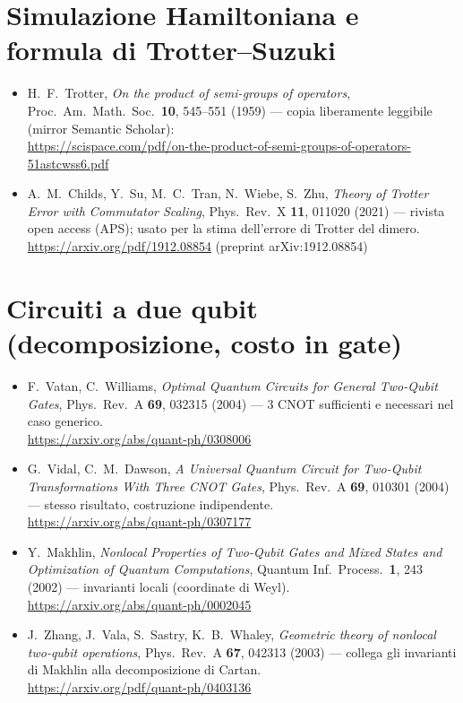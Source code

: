 \documentclass[11pt,a4paper]{article}
\begin{document}
\section{Simulazione Hamiltoniana e formula di Trotter--Suzuki}

\begin{itemize}[leftmargin=1.3em]
\item H.\ F.\ Trotter, \emph{On the product of semi-groups of operators}, Proc.\ Am.\ Math.\ Soc.\ \textbf{10}, 545--551 (1959) — copia liberamente leggibile (mirror Semantic Scholar):\\
\url{https://scispace.com/pdf/on-the-product-of-semi-groups-of-operators-51astcwss6.pdf}

\item A.\ M.\ Childs, Y.\ Su, M.\ C.\ Tran, N.\ Wiebe, S.\ Zhu, \emph{Theory of Trotter Error with Commutator Scaling}, Phys.\ Rev.\ X \textbf{11}, 011020 (2021) — rivista open access (APS); usato per la stima dell'errore di Trotter del dimero.\\
\url{https://arxiv.org/pdf/1912.08854} \quad (preprint arXiv:1912.08854)
\end{itemize}

\section{Circuiti a due qubit (decomposizione, costo in gate)}

\begin{itemize}[leftmargin=1.3em]
\item F.\ Vatan, C.\ Williams, \emph{Optimal Quantum Circuits for General Two-Qubit Gates}, Phys.\ Rev.\ A \textbf{69}, 032315 (2004) — 3 CNOT sufficienti e necessari nel caso generico.\\
\url{https://arxiv.org/abs/quant-ph/0308006}

\item G.\ Vidal, C.\ M.\ Dawson, \emph{A Universal Quantum Circuit for Two-Qubit Transformations With Three CNOT Gates}, Phys.\ Rev.\ A \textbf{69}, 010301 (2004) — stesso risultato, costruzione indipendente.\\
\url{https://arxiv.org/abs/quant-ph/0307177}

\item Y.\ Makhlin, \emph{Nonlocal Properties of Two-Qubit Gates and Mixed States and Optimization of Quantum Computations}, Quantum Inf.\ Process.\ \textbf{1}, 243 (2002) — invarianti locali (coordinate di Weyl).\\
\url{https://arxiv.org/abs/quant-ph/0002045}

\item J.\ Zhang, J.\ Vala, S.\ Sastry, K.\ B.\ Whaley, \emph{Geometric theory of nonlocal two-qubit operations}, Phys.\ Rev.\ A \textbf{67}, 042313 (2003) — collega gli invarianti di Makhlin alla decomposizione di Cartan.\\
\url{https://arxiv.org/pdf/quant-ph/0403136}
\end{itemize}
\end{document}
